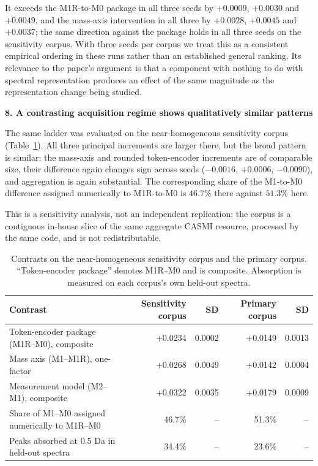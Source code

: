 \documentclass[11pt]{article}
\newcommand{\hd}[1]{\medskip\par\noindent\textbf{#1}\par\nobreak\vspace{2pt}\noindent\ignorespaces}
\begin{document}
It exceeds the M1R-to-M0 package in all three seeds by $+0.0009$, $+0.0030$ and $+0.0049$, and the mass-axis intervention in all three by $+0.0028$, $+0.0045$ and $+0.0037$; the same direction against the package holds in all three seeds on the sensitivity corpus. With three seeds per corpus we treat this as a consistent empirical ordering in these runs rather than an established general ranking. Its relevance to the paper's argument is that a component with nothing to do with spectral representation produces an effect of the same magnitude as the representation change being studied.

\hd{8. A contrasting acquisition regime shows qualitatively similar patterns}
The same ladder was evaluated on the near-homogeneous sensitivity corpus (Table~\ref{tab:corpora}). All three principal increments are larger there, but the broad pattern is similar: the mass-axis and rounded token-encoder increments are of comparable size, their difference again changes sign across seeds ($-0.0016$, $+0.0006$, $-0.0090$), and aggregation is again substantial. The corresponding share of the M1-to-M0 difference assigned numerically to M1R-to-M0 is $46.7\%$ there against $51.3\%$ here.

This is a sensitivity analysis, not an independent replication: the corpus is a contiguous in-house slice of the same aggregate CASMI resource, processed by the same code, and is not redistributable.

\begin{table}[ht]
\centering
\caption{Contrasts on the near-homogeneous sensitivity corpus and the primary corpus. ``Token-encoder package'' denotes M1R--M0 and is composite. Absorption is measured on each corpus's own held-out spectra.}
\label{tab:corpora}
\small
\begin{tabular}{lrrrr}
\toprule
Contrast & Sensitivity corpus & SD & Primary corpus & SD\\
\midrule
Token-encoder package (M1R--M0), composite & +0.0234 & 0.0002 & +0.0149 & 0.0013\\
Mass axis (M1--M1R), one-factor & +0.0268 & 0.0049 & +0.0142 & 0.0004\\
Measurement model (M2--M1), composite & +0.0322 & 0.0035 & +0.0179 & 0.0009\\
Share of M1--M0 assigned numerically to M1R--M0 & 46.7\% & -- & 51.3\% & --\\
Peaks absorbed at 0.5 Da in held-out spectra & 34.4\% & -- & 23.6\% & --\\
\bottomrule
\end{tabular}
\end{table}
\end{document}
